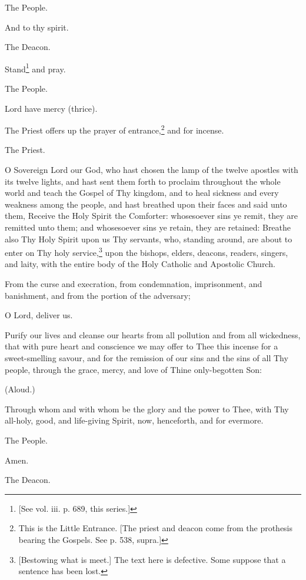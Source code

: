 The People.

And to thy spirit.

The Deacon.

Stand\footnote{\par{}  [See vol. iii. p. 689, this series.]} and pray.

The People.

Lord have mercy (thrice).

The Priest offers up the prayer of entrance,\footnote{\par  This is the Little Entrance. [The priest and deacon come from the prothesis bearing the Gospels. See p. 538, supra.]} and for incense.

The Priest.

O Sovereign Lord our God, who hast chosen the lamp of the twelve apostles with its twelve lights, and hast sent them forth to proclaim throughout the whole world and teach the Gospel of Thy kingdom, and to heal sickness and every weakness among the people, and hast breathed upon their faces and said unto them, Receive the Holy Spirit the Comforter: whosesoever sins ye remit, they are remitted unto them; and whosesoever sins ye retain, they are retained: Breathe also Thy Holy Spirit upon us Thy servants, who, standing around, are about to enter on Thy holy service,\footnote{\par{}  [Bestowing what is meet.] The text here is defective. Some suppose that a sentence has been lost.} upon the bishops, elders, deacons, readers, singers, and laity, with the entire body of the Holy Catholic and Apostolic Church.

From the curse and execration, from condemnation, imprisonment, and banishment, and from the portion of the adversary;

O Lord, deliver us.

Purify our lives and cleanse our hearts from all pollution and from all wickedness, that with pure heart and conscience we may offer to Thee this incense for a sweet-smelling savour, and for the remission of our sins and the sins of all Thy people, through the grace, mercy, and love of Thine only-begotten Son:

(Aloud.)

Through whom and with whom be the glory and the power to Thee, with Thy all-holy, good, and life-giving Spirit, now, henceforth, and for evermore.

The People.

Amen.

The Deacon.

